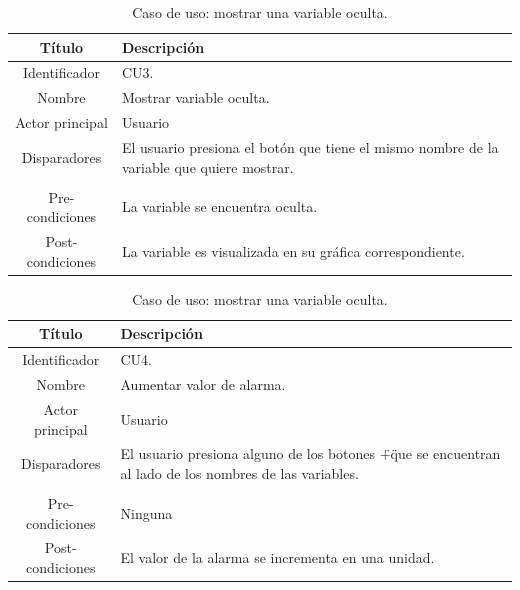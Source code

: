 \begin{table}[htpb]
	\centering
	\caption{Caso de uso: mostrar una variable oculta.}
	\centering
	\begin{tabular}{c p{}}    
		\toprule
		\textbf{Título }     & \textbf{Descripción} \\
		\midrule
		Identificador		&	CU3. \\
		Nombre				& 	Mostrar variable oculta. \\
		Actor principal		&   Usuario \\
		Disparadores		&   El usuario presiona el botón que tiene el mismo nombre de la variable que quiere mostrar. \\
\\
		Pre-condiciones		&   La variable se encuentra oculta. \\
		Post-condiciones	&   La variable es visualizada en su gráfica correspondiente.\\
		\bottomrule
	\end{tabular}
\label{tab:caso-mostrar}
\end{table}

\begin{table}[htpb]
	\centering
	\caption{Caso de uso: mostrar una variable oculta.}
	\centering
	\begin{tabular}{c p{}}    
		\toprule
		\textbf{Título }     & \textbf{Descripción} \\
		\midrule
		Identificador		&	CU4. \\
		Nombre				& 	Aumentar valor de alarma. \\
		Actor principal		&   Usuario \\
		Disparadores		&   El usuario presiona alguno de los botones \"+\" que se encuentran al lado de los nombres de las variables. \\
\\
		Pre-condiciones		&   Ninguna \\
		Post-condiciones	&   El valor de la alarma se incrementa en una unidad.\\
		\bottomrule
	\end{tabular}
\label{tab:caso-aumentar}
\end{table}

